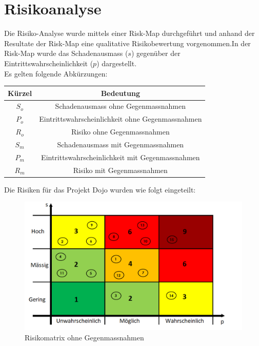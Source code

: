 \documentclass[10pt,a4paper,oneside]{99_fhnwreport}
\begin{document}
\section{Risikoanalyse}\label{sec:risikoanalyse}
Die Risiko-Analyse wurde mittels einer Risk-Map durchgeführt und anhand der Resultate der Risk-Map eine qualitative Risikobewertung vorgenommen.In der Risk-Map wurde das Schadenausmass ($s$) gegenüber der Eintrittswahrscheinlichkeit ($p$) dargestellt.\\
Es gelten folgende Abkürzungen: 

\begin{center}

	\begin{tabular}{|c|c|}
		\hline
		 \textbf{Kürzel} &  \textbf{Bedeutung} \\ \hline
		$S_{o}$ & Schadenausmass ohne Gegenmassnahmen \\ \hline
		$P_{o}$ & Eintrittswahrscheinlichkeit ohne Gegenmassnahmen \\ \hline
		$R_{o}$ & Risiko ohne Gegenmassnahmen \\ \hline
		$S_{m}$ & Schadenausmass mit Gegenmassnahmen \\ \hline
		$P_{m}$ & Eintrittswahrscheinlichkeit mit  Gegenmassnahmen \\ \hline
		$R_{m}$ & Risiko mit Gegenmassnahmen \\ \hline 
	\end{tabular}

\end{center}

Die Risiken für das Projekt Dojo wurden wie folgt eingeteilt:

\begin{figure}[htbp]
	\centering
	\includegraphics[width=13.5cm]{risiko1.png}
		\caption{Risikomatrix ohne Gegenmassnahmen}
\end{figure}
\end{document}

